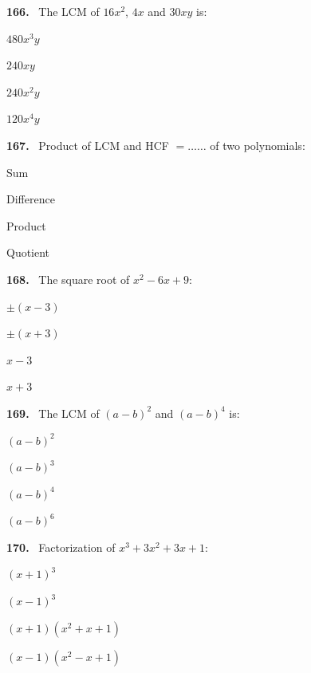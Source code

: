\documentclass[11pt]{article}
\newenvironment{qenv}[1]{%
  \par\medskip\noindent\textbf{#1.}\ \ignorespaces
}{\par}
\begin{document}
\begin{qenv}{166} The LCM of $16x^2$, $4x$ and $30xy$ is:
\begin{options} \item $480x^3y$ \item $240xy$ \item $240x^2y$ \item $120x^4y$ \end{options} \end{qenv}

\begin{qenv}{167} Product of LCM and HCF $= \ldots\ldots$ of two polynomials:
\begin{options} \item Sum \item Difference \item Product \item Quotient \end{options} \end{qenv}

\begin{qenv}{168} The square root of $x^2-6x+9$:
\begin{options} \item $\pm(x-3)$ \item $\pm(x+3)$ \item $x-3$ \item $x+3$ \end{options} \end{qenv}

\begin{qenv}{169} The LCM of $(a-b)^2$ and $(a-b)^4$ is:
\begin{options} \item $(a-b)^2$ \item $(a-b)^3$ \item $(a-b)^4$ \item $(a-b)^6$ \end{options} \end{qenv}

\begin{qenv}{170} Factorization of $x^3+3x^2+3x+1$:
\begin{options} \item $(x+1)^3$ \item $(x-1)^3$ \item $(x+1)(x^2+x+1)$ \item $(x-1)(x^2-x+1)$ \end{options} \end{qenv}
\end{document}
